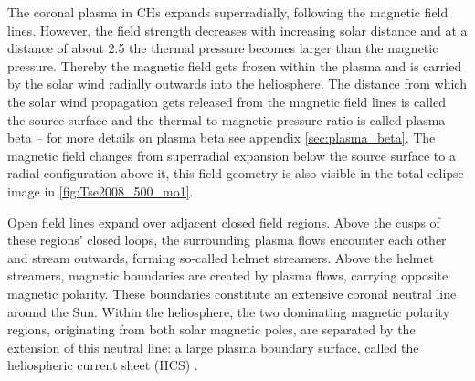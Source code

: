 The coronal plasma in CHs expands superradially, following the magnetic field lines. However, the field strength decreases with increasing solar distance and at a distance of about \SI{2.5}{\Rs} the thermal pressure becomes larger than the magnetic pressure. Thereby the magnetic field gets frozen within the plasma and is carried by the solar wind radially outwards into the heliosphere. The distance from which the solar wind propagation gets released from the magnetic field lines is called the source surface \citep{Schatten1969} and the thermal to magnetic pressure ratio is called plasma beta -- for more details on plasma beta see appendix \autoref{sec:plasma_beta}. The magnetic field changes from superradial expansion below the source surface to a radial configuration above it, this field geometry is also visible in the total eclipse image in \autoref{fig:Tse2008_500_mo1}.

Open field lines expand over adjacent closed field regions. Above the cusps of these regions' closed loops, the surrounding plasma flows encounter each other and stream outwards, forming so-called helmet streamers. Above the helmet streamers, magnetic boundaries are created by plasma flows, carrying opposite magnetic polarity. These boundaries constitute an extensive coronal neutral line around the Sun. Within the heliosphere, the two dominating magnetic polarity regions, originating from both solar magnetic poles, are separated by the extension of this neutral line: a large plasma boundary surface, called the heliospheric current sheet (HCS) \citep{Smith2001}.

